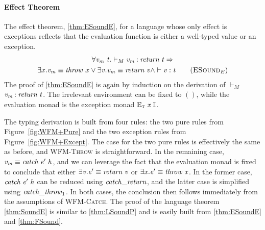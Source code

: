 \paragraph{Effect Theorem} The effect theorem, \ref{thm:ESoundE}, for a
language whose only effect is exceptions reflects that the evaluation
function is either a well-typed value or an exception.
\begin{multline}
\forall \ensuremath{\Varid{v}_\Varid{m}}~\ensuremath{\Varid{t}}. \vdash_M \ensuremath{\Varid{v}_\Varid{m}\mathbin{:}\Varid{return}\;\Varid{t}} \Rightarrow \\
\exists x. \ensuremath{\Varid{v}_\Varid{m}\equiv \Varid{throw}}~x \lor \exists \ensuremath{\Varid{v}}. \ensuremath{\Varid{v}_\Varid{m}\equiv \Varid{return}\;\Varid{v}} \wedge \vdash \ensuremath{\Varid{v}} :
\ensuremath{\Varid{t}}
\tag{\textsc{ESound$_E$}}\label{thm:ESoundE}
\end{multline}
The proof of \ref{thm:ESoundE} is again by induction on the derivation
of $ \vdash_M$ \ensuremath{\Varid{v}_\Varid{m}\mathbin{:}\Varid{return}\;\Varid{t}}. The irrelevant environment
can be fixed to \ensuremath{()}, while the evaluation monad is the
exception monad \ensuremath{\mathbb{E}_{\scalebox{0.6}{T}}\;\Varid{x}\;\mathbb{I}}.

The typing derivation is built from four rules: the two pure rules
from Figure~\ref{fig:WFM+Pure} and the two exception rules from
Figure~\ref{fig:WFM+Except}.  The case for the two pure rules is
effectively the same as before, and \textsc{WFM-Throw} is
straightforward. In the remaining case, \ensuremath{\Varid{v}_\Varid{m}\equiv \Varid{catch}\;\Varid{e'}\;\Varid{h}}, and we can
leverage the fact that the evaluation monad is fixed to conclude that
either $\exists \mathit{v}.\mathit{e'}\equiv \mathit{return}\;\mathit{v}$ or $\exists \mathit{x}. \mathit{e'}\equiv \mathit{throw}\;\mathit{x}$. In the former case, \ensuremath{\Varid{catch}\;\Varid{e'}\;\Varid{h}} can be reduced using
\ensuremath{\Varid{catch\char95 return}}, and the latter case is simplified using
\ensuremath{\Varid{catch\char95 throw}_{1}}. In both cases, the conclusion then follows immediately
from the assumptions of \textsc{WFM-Catch}.  The proof of the language
theorem \ref{thm:SoundE} is similar to \ref{thm:LSoundP} and is easily
built from \ref{thm:ESoundE} and \ref{thm:FSound}.

